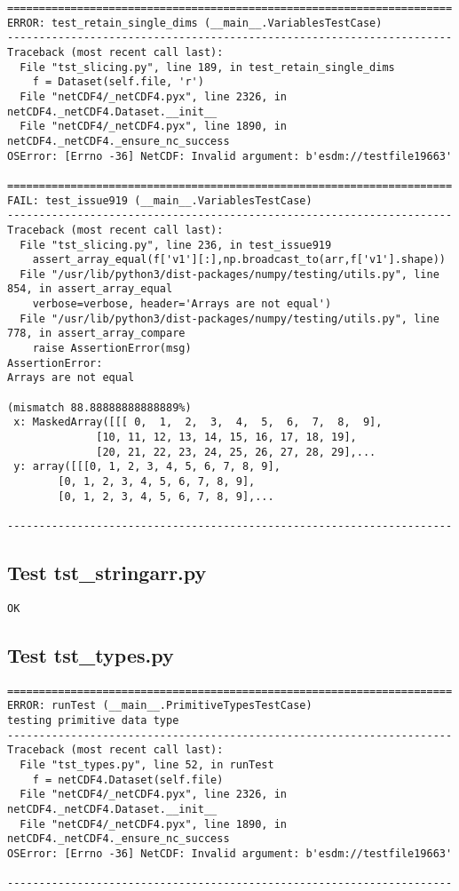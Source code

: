 \begin{verbatim}
======================================================================
ERROR: test_retain_single_dims (__main__.VariablesTestCase)
----------------------------------------------------------------------
Traceback (most recent call last):
  File "tst_slicing.py", line 189, in test_retain_single_dims
    f = Dataset(self.file, 'r')
  File "netCDF4/_netCDF4.pyx", line 2326, in netCDF4._netCDF4.Dataset.__init__
  File "netCDF4/_netCDF4.pyx", line 1890, in netCDF4._netCDF4._ensure_nc_success
OSError: [Errno -36] NetCDF: Invalid argument: b'esdm://testfile19663'

======================================================================
FAIL: test_issue919 (__main__.VariablesTestCase)
----------------------------------------------------------------------
Traceback (most recent call last):
  File "tst_slicing.py", line 236, in test_issue919
    assert_array_equal(f['v1'][:],np.broadcast_to(arr,f['v1'].shape))
  File "/usr/lib/python3/dist-packages/numpy/testing/utils.py", line 854, in assert_array_equal
    verbose=verbose, header='Arrays are not equal')
  File "/usr/lib/python3/dist-packages/numpy/testing/utils.py", line 778, in assert_array_compare
    raise AssertionError(msg)
AssertionError:
Arrays are not equal

(mismatch 88.88888888888889%)
 x: MaskedArray([[[ 0,  1,  2,  3,  4,  5,  6,  7,  8,  9],
              [10, 11, 12, 13, 14, 15, 16, 17, 18, 19],
              [20, 21, 22, 23, 24, 25, 26, 27, 28, 29],...
 y: array([[[0, 1, 2, 3, 4, 5, 6, 7, 8, 9],
        [0, 1, 2, 3, 4, 5, 6, 7, 8, 9],
        [0, 1, 2, 3, 4, 5, 6, 7, 8, 9],...

----------------------------------------------------------------------
\end{verbatim}

\subsection{Test tst\_stringarr.py}

\begin{verbatim}
OK
\end{verbatim}

\subsection{Test tst\_types.py}

\begin{verbatim}
======================================================================
ERROR: runTest (__main__.PrimitiveTypesTestCase)
testing primitive data type
----------------------------------------------------------------------
Traceback (most recent call last):
  File "tst_types.py", line 52, in runTest
    f = netCDF4.Dataset(self.file)
  File "netCDF4/_netCDF4.pyx", line 2326, in netCDF4._netCDF4.Dataset.__init__
  File "netCDF4/_netCDF4.pyx", line 1890, in netCDF4._netCDF4._ensure_nc_success
OSError: [Errno -36] NetCDF: Invalid argument: b'esdm://testfile19663'

----------------------------------------------------------------------
\end{verbatim}

